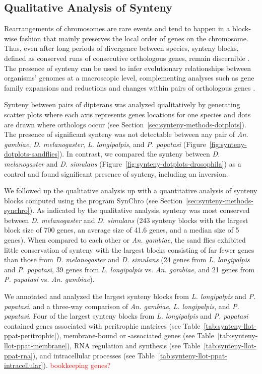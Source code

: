 \subsection{Qualitative Analysis of Synteny}
Rearrangements of chromosomes are rare events and tend to happen in a block-wise fashion that mainly preserves the local order of genes on the chromosome. Thus, even after long periods of divergence between species, synteny blocks, defined as conserved runs of consecutive orthologous genes, remain discernible \cite{Heger2007}.  The presence of synteny can be used to infer evolutionary relationships between organisms' genomes at a macroscopic level, complementing analyses such as gene family expansions and reductions and changes within pairs of orthologous genes \cite{Zdobnov2002,Zdobnov2007}.

Synteny between pairs of dipterans was analyzed qualitatively by generating scatter plots where each axis represents genes locations for one species and dots are drawn where orthologs occur (see Section~\ref{sec:synteny-methods-dotplots}). The presence of significant synteny was not detectable between any pair of \emph{An. gambiae}, \emph{D. melanogaster}, \emph{L. longipalpis}, and \emph{P. papatasi} (Figure~\ref{fig:synteny-dotplots-sandflies}).  In contrast, we compared the synteny between \emph{D. melanogaster} and \emph{D. simulans} (Figure~\ref{fig:synteny-dotplots-drosophila}) as a control and found significant presence of synteny, including an inversion.

We followed up the qualitative analysis up with a quantitative analysis of synteny blocks computed using the program SynChro (see Section~\ref{sec:synteny-methods-synchro}). As indicated by the qualitative analysis, synteny was most conserved between \emph{D. melanogaster} and \emph{D. simulans} (243 synteny blocks with the largest block size of 700 genes, an average size of 41.6 genes, and a median size of 5 genes).  When compared to each other or \emph{An. gambiae}, the sand flies exhibited little conservation of synteny with the largest blocks consisting of far fewer genes than those from \emph{D. melanogaster} and \emph{D. simulans} (24 genes from \emph{L. longipalpis} and \emph{P. papatasi}, 39 genes from \emph{L. longipalpis} vs. \emph{An. gambiae}, and 21 genes from \emph{P. papatasi} vs. \emph{An. gambiae}).

We annotated and analyzed the largest synteny blocks from \emph{L. longipalpis} and \emph{P. papatasi}. and a three-way comparison of \emph{An. gambiae}, \emph{L. longipalpis}, and \emph{P. papatasi}.  Four of the largest synteny blocks from \emph{L. longipalpis} and \emph{P. papatasi} contained genes associated with peritrophic matrices (see Table~\ref{tab:synteny-llot-ppat-peritrophic}), membrane-bound or -associated genes (see Table~\ref{tab:synteny-llot-ppat-membrane}), RNA regulation and synthesis (see Table~\ref{tab:synteny-llot-ppat-rna}), and intracellular processes (see Table~\ref{tab:synteny-llot-ppat-intracellular}). \textcolor{red}{bookkeeping genes?}

